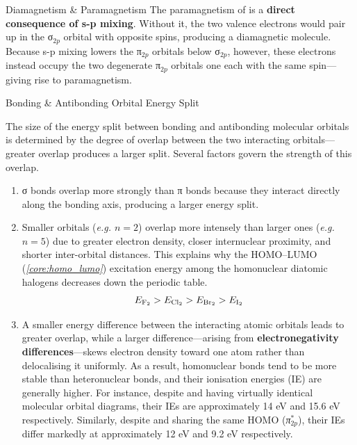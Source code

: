 \documentclass[10pt]{article}
\begin{document}
\begin{core}[label=core:magnetism]{Diamagnetism \& Paramagnetism}
      The paramagnetism of  is a \textbf{direct consequence of s-p mixing}. Without it, the two valence electrons would pair up in the σ$_{2p}$ orbital with opposite spins, producing a diamagnetic molecule. Because s-p mixing lowers the π$_{2p}$ orbitals below σ$_{2p}$, however, these electrons instead occupy the two degenerate π$_{2p}$ orbitals one each with the same spin---giving rise to paramagnetism.

    \end{core}

    \begin{core}[label=core:bond_antibonding]{Bonding \& Antibonding Orbital Energy Split}

      The size of the energy split between bonding and antibonding molecular orbitals is determined by the degree of overlap between the two interacting orbitals---greater overlap produces a larger split. Several factors govern the strength of this overlap.

      \begin{enumerate}

        \item σ bonds overlap more strongly than π bonds because they interact directly along the bonding axis, producing a larger energy split.

        \item Smaller orbitals (\textit{e.g. $n=2$}) overlap more intensely than larger ones (\textit{e.g. $n=5$}) due to greater electron density, closer internuclear proximity, and shorter inter-orbital distances. This explains why the HOMO--LUMO (\textit{\autoref{core:homo_lumo}}) excitation energy among the homonuclear diatomic halogens decreases down the periodic table.
        \[
          E_{\ce{F2}} > E_{\ce{Cl2}} > E_{\ce{Br2}} > E_{\ce{I2}}
        \]

        \item A smaller energy difference between the interacting atomic orbitals leads to greater overlap, while a larger difference---arising from \textbf{electronegativity differences}---skews electron density toward one atom rather than delocalising it uniformly. As a result, homonuclear bonds tend to be more stable than heteronuclear bonds, and their ionisation energies (IE) are generally higher. For instance, despite  and  having virtually identical molecular orbital diagrams, their IEs are approximately 14 eV and 15.6 eV respectively. Similarly, despite  and  sharing the same HOMO (\textit{π$^*_{2p}$}), their IEs differ markedly at approximately 12 eV and 9.2 eV respectively.

      \end{enumerate}

    \end{core}
    
\end{document}
